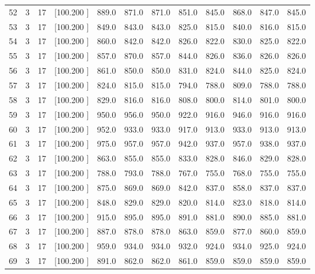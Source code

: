 \documentclass[12pt,a4paper]{article}
\begin{document}
\begin{center}
{\begin{tabular}{r r r r r r r r r r r r}
  52&  3& 17&[100.200   ]&   889.0&   871.0&   871.0&   851.0&   845.0&   868.0&   847.0&   845.0\\[-0.02in]
  53&  3& 17&[100.200   ]&   849.0&   843.0&   843.0&   825.0&   815.0&   840.0&   816.0&   815.0\\[-0.02in]
  54&  3& 17&[100.200   ]&   860.0&   842.0&   842.0&   826.0&   822.0&   830.0&   825.0&   822.0\\[-0.02in]
  55&  3& 17&[100.200   ]&   857.0&   870.0&   857.0&   844.0&   826.0&   836.0&   826.0&   826.0\\[-0.02in]
  56&  3& 17&[100.200   ]&   861.0&   850.0&   850.0&   831.0&   824.0&   844.0&   825.0&   824.0\\[-0.02in]
  57&  3& 17&[100.200   ]&   824.0&   815.0&   815.0&   794.0&   788.0&   809.0&   788.0&   788.0\\[-0.02in]
  58&  3& 17&[100.200   ]&   829.0&   816.0&   816.0&   808.0&   800.0&   814.0&   801.0&   800.0\\[-0.02in]
  59&  3& 17&[100.200   ]&   950.0&   956.0&   950.0&   922.0&   916.0&   946.0&   916.0&   916.0\\[-0.02in]
  60&  3& 17&[100.200   ]&   952.0&   933.0&   933.0&   917.0&   913.0&   933.0&   913.0&   913.0\\[-0.02in]
  61&  3& 17&[100.200   ]&   975.0&   957.0&   957.0&   942.0&   937.0&   957.0&   938.0&   937.0\\[-0.02in]
  62&  3& 17&[100.200   ]&   863.0&   855.0&   855.0&   833.0&   828.0&   846.0&   829.0&   828.0\\[-0.02in]
  63&  3& 17&[100.200   ]&   788.0&   793.0&   788.0&   767.0&   755.0&   768.0&   755.0&   755.0\\[-0.02in]
  64&  3& 17&[100.200   ]&   875.0&   869.0&   869.0&   842.0&   837.0&   858.0&   837.0&   837.0\\[-0.02in]
  65&  3& 17&[100.200   ]&   848.0&   829.0&   829.0&   820.0&   814.0&   823.0&   818.0&   814.0\\[-0.02in]
  66&  3& 17&[100.200   ]&   915.0&   895.0&   895.0&   891.0&   881.0&   890.0&   885.0&   881.0\\[-0.02in]
  67&  3& 17&[100.200   ]&   887.0&   878.0&   878.0&   863.0&   859.0&   877.0&   860.0&   859.0\\[-0.02in]
  68&  3& 17&[100.200   ]&   959.0&   934.0&   934.0&   932.0&   924.0&   934.0&   925.0&   924.0\\[-0.02in]
  69&  3& 17&[100.200   ]&   891.0&   862.0&   862.0&   861.0&   859.0&   859.0&   859.0&   859.0\\[-0.02in]

\end{tabular}}
\end{center}
\end{document}
